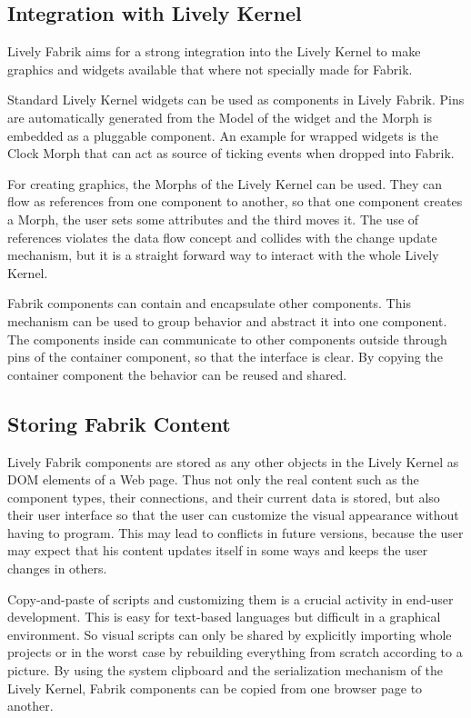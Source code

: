 \documentclass[pdftex, times, 10pt, twocolumn]{article}
\begin{document}
\subsection{Integration with Lively Kernel}
Lively Fabrik aims for a strong integration into the Lively Kernel to make graphics and widgets available that where not specially made for Fabrik.  

Standard Lively Kernel widgets can be used as components in Lively Fabrik. Pins are automatically generated from the Model of the widget and the Morph is embedded as a pluggable component. An example for wrapped widgets is the Clock Morph that can act as source of ticking events when dropped into Fabrik.  

For creating graphics, the Morphs of the Lively Kernel can be used. They can flow as references from one component to another, so that one component creates a Morph, the user sets some attributes and the third moves it. The use of references violates the data flow concept and collides with the change update mechanism, but it is a straight forward way to interact with the whole Lively Kernel. 

Fabrik components can contain and encapsulate other components. This mechanism can be used to group behavior and abstract it into one component. The components inside can communicate to other components outside through pins of the container component, so that the interface is clear. By copying the container component the behavior can be reused and shared. 



\subsection{Storing Fabrik Content}
Lively Fabrik components are stored as any other objects in the Lively Kernel as DOM elements of a Web page. Thus not only the real content such as the component types, their connections, and their current data is stored, but also their user interface so that the user can customize the visual appearance without having to program. This may lead to conflicts in future versions, because the user may expect that his content updates itself in some ways and keeps the user changes in others.  

Copy-and-paste of scripts and customizing them is a crucial activity in end-user development.  This is easy for text-based languages but difficult in a graphical environment.  So visual scripts can only be shared by explicitly importing whole projects or in the worst case by rebuilding everything from scratch according to a picture.  By using the system clipboard and the serialization mechanism of the Lively Kernel, Fabrik components can be copied from one browser page to another. 
\end{document}
